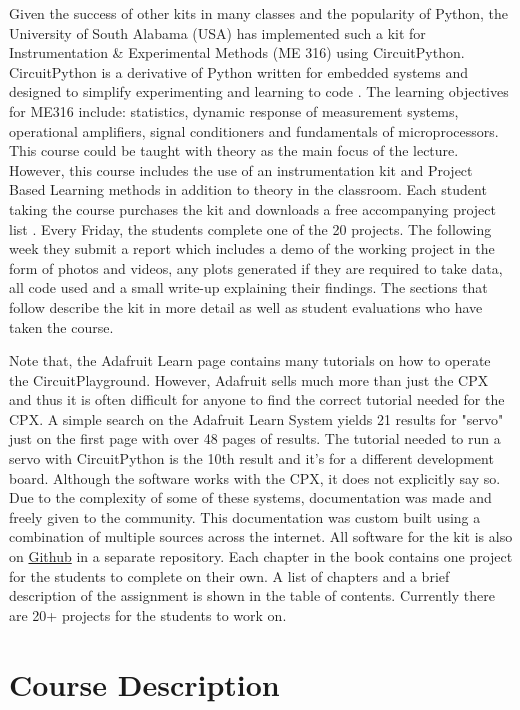 Given the success of other kits in many classes and the popularity of
Python, the University of South Alabama (USA) has implemented such a
kit for Instrumentation \& Experimental Methods (ME 316) using
CircuitPython. CircuitPython is a derivative of Python written for
embedded systems and designed to simplify experimenting and learning
to code \cite{CircuitPython}. The learning objectives for ME316
include: statistics, dynamic response of measurement systems,
operational amplifiers, signal conditioners and fundamentals of
microprocessors. This course could be taught with theory as the main
focus of the lecture. However, this course includes the use of an
instrumentation kit and Project Based Learning methods in addition to
theory in the classroom. Each student taking the course purchases the
kit and downloads a free accompanying project
list \cite{Gitbook}. Every Friday, the students complete one of the 20
projects. The following week they submit a report which includes a
demo of the working project in the form of photos and videos, any
plots generated if they are required to take data, all code used and a
small write-up explaining their findings. The sections that follow
describe the kit in more detail as well as student evaluations who
have taken the course.

Note that, the Adafruit Learn page contains many tutorials on how to operate the
CircuitPlayground\cite{Adafruit}. However, Adafruit sells much
more than just the CPX and thus it is often difficult for anyone to
find the correct tutorial needed for the CPX. A simple search on the
Adafruit Learn System yields 21 results for "servo" just on the first
page with over 48 pages of results. The tutorial needed to run a servo
with CircuitPython is the 10th result and it's for a different
development board. Although the software works with the CPX, it does
not explicitly say so. Due to the complexity of some of these systems,
documentation was made and freely given to the
community\cite{Gitbook}. This documentation was custom built using a
combination of multiple sources across the internet. All software for
the kit is also
on \href{www.github.com/cmontalvo251/Microcontrollers.git}{Github} in
a separate repository. Each chapter in the book contains one project for the
students to complete on their own. A list of chapters and a brief
description of the assignment is shown in the table of
contents. Currently there are 20+ projects for the students to work on.

\section{Course Description}


